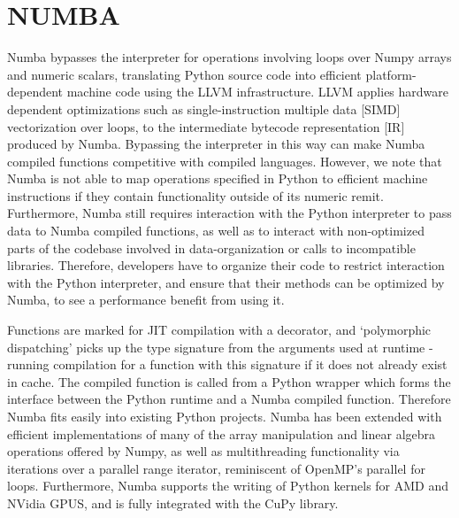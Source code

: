 \documentclass{IEEEcsmag}
\begin{document}
\section{NUMBA}

Numba bypasses the interpreter for operations involving loops over Numpy arrays and numeric scalars, translating Python source code into efficient platform-dependent machine code using the LLVM infrastructure. LLVM applies hardware dependent optimizations such as single-instruction multiple data [SIMD] vectorization over loops, to the intermediate bytecode representation [IR] produced by Numba. Bypassing the interpreter in this way can make Numba compiled functions competitive with compiled languages. However, we note that Numba is not able to map operations specified in Python to efficient machine instructions if they contain functionality outside of its numeric remit. Furthermore, Numba still requires interaction with the Python interpreter to pass data to Numba compiled functions, as well as to interact with non-optimized parts of the codebase involved in data-organization or calls to incompatible libraries. Therefore, developers have to organize their code to restrict interaction with the Python interpreter, and ensure that their methods can be optimized by Numba, to see a performance benefit from using it.

Functions are marked for JIT compilation with a decorator, and `polymorphic dispatching' picks up the type signature from the arguments used at runtime - running compilation for a function with this signature if it does not already exist in cache. The compiled function is called from a Python wrapper which forms the interface between the Python runtime and a Numba compiled function. Therefore Numba fits easily into existing Python projects. Numba has been extended with efficient implementations of many of the array manipulation and linear algebra operations offered by Numpy, as well as multithreading functionality via iterations over a parallel range iterator, reminiscent of OpenMP's parallel for loops. Furthermore, Numba supports the writing of Python kernels for AMD and NVidia GPUS, and is fully integrated with the CuPy library.
\end{document}
